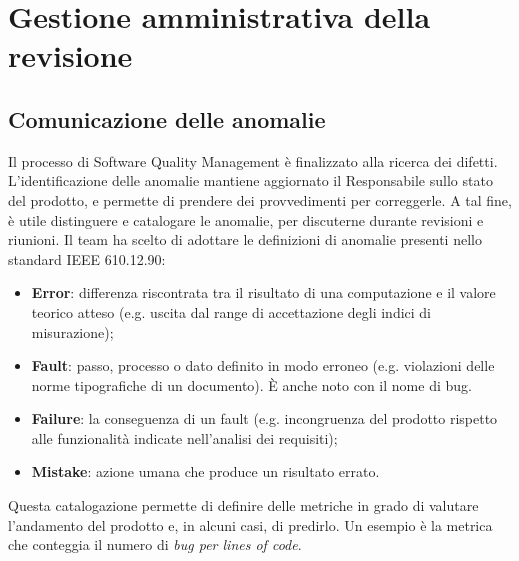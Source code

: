 \newpage
\section{Gestione amministrativa della revisione}
\subsection{Comunicazione delle anomalie}
Il processo di Software Quality Management è finalizzato alla ricerca dei difetti. L'identificazione delle anomalie mantiene aggiornato il Responsabile sullo stato del prodotto, e permette di prendere dei provvedimenti per correggerle. A tal fine, è utile distinguere e catalogare le anomalie, per discuterne durante revisioni e riunioni. Il team ha scelto di adottare le definizioni di anomalie presenti nello standard IEEE 610.12.90:
\begin{itemize}
\item \textbf{Error}: differenza riscontrata tra il risultato di una computazione e il valore teorico atteso (e.g. uscita dal range di accettazione degli indici di misurazione);
\item \textbf{Fault}: passo, processo o dato definito in modo erroneo (e.g. violazioni delle norme tipografiche di un documento). \`E anche noto con il nome di bug.
\item \textbf{Failure}: la conseguenza di un fault (e.g. incongruenza del prodotto rispetto alle funzionalità indicate nell'analisi dei requisiti);
\item \textbf{Mistake}: azione umana che produce un risultato errato.
\end{itemize}
Questa catalogazione permette di definire delle metriche in grado di valutare l'andamento del prodotto e, in alcuni casi, di predirlo. Un esempio è la metrica che conteggia il numero di \textit{bug per lines of code}.

